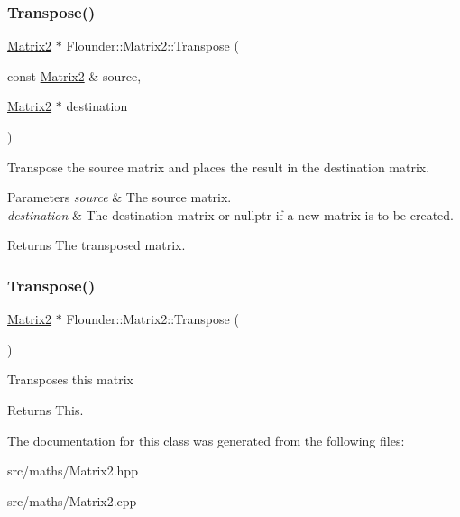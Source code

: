 \subsubsection{\texorpdfstring{Transpose()}{Transpose()}\hspace{0.1cm}{\footnotesize\ttfamily [1/2]}}
{\footnotesize\ttfamily \hyperlink{class_flounder_1_1_matrix2}{Matrix2} $\ast$ Flounder\+::\+Matrix2\+::\+Transpose (\begin{DoxyParamCaption}\item[{const \hyperlink{class_flounder_1_1_matrix2}{Matrix2} \&}]{source,  }\item[{\hyperlink{class_flounder_1_1_matrix2}{Matrix2} $\ast$}]{destination }\end{DoxyParamCaption})\hspace{0.3cm}{\ttfamily [static]}}



Transpose the source matrix and places the result in the destination matrix. 


\begin{DoxyParams}{Parameters}
{\em source} & The source matrix. \\
\hline
{\em destination} & The destination matrix or nullptr if a new matrix is to be created. \\
\hline
\end{DoxyParams}
\begin{DoxyReturn}{Returns}
The transposed matrix. 
\end{DoxyReturn}
\mbox{\label{class_flounder_1_1_matrix2_a3167f5dd9e522e9c7aaf9a0cdce42794}} 
\subsubsection{\texorpdfstring{Transpose()}{Transpose()}\hspace{0.1cm}{\footnotesize\ttfamily [2/2]}}
{\footnotesize\ttfamily \hyperlink{class_flounder_1_1_matrix2}{Matrix2} $\ast$ Flounder\+::\+Matrix2\+::\+Transpose (\begin{DoxyParamCaption}{ }\end{DoxyParamCaption})}



Transposes this matrix 

\begin{DoxyReturn}{Returns}
This. 
\end{DoxyReturn}


The documentation for this class was generated from the following files\+:\begin{DoxyCompactItemize}
\item 
src/maths/Matrix2.\+hpp\item 
src/maths/Matrix2.\+cpp\end{DoxyCompactItemize}
